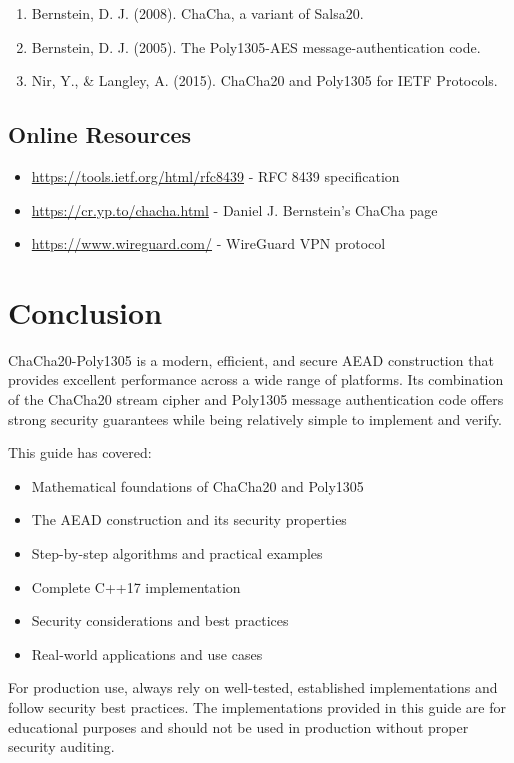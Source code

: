 \documentclass[11pt,a4paper]{article}
\begin{document}
\begin{enumerate}
    \item Bernstein, D. J. (2008). ChaCha, a variant of Salsa20.
    \item Bernstein, D. J. (2005). The Poly1305-AES message-authentication code.
    \item Nir, Y., \& Langley, A. (2015). ChaCha20 and Poly1305 for IETF Protocols.
\end{enumerate}

\subsection{Online Resources}

\begin{itemize}
    \item \url{https://tools.ietf.org/html/rfc8439} - RFC 8439 specification
    \item \url{https://cr.yp.to/chacha.html} - Daniel J. Bernstein's ChaCha page
    \item \url{https://www.wireguard.com/} - WireGuard VPN protocol
\end{itemize}

\section{Conclusion}

ChaCha20-Poly1305 is a modern, efficient, and secure AEAD construction that provides excellent performance across a wide range of platforms. Its combination of the ChaCha20 stream cipher and Poly1305 message authentication code offers strong security guarantees while being relatively simple to implement and verify.

This guide has covered:
\begin{itemize}
    \item Mathematical foundations of ChaCha20 and Poly1305
    \item The AEAD construction and its security properties
    \item Step-by-step algorithms and practical examples
    \item Complete C++17 implementation
    \item Security considerations and best practices
    \item Real-world applications and use cases
\end{itemize}

For production use, always rely on well-tested, established implementations and follow security best practices. The implementations provided in this guide are for educational purposes and should not be used in production without proper security auditing.
\end{document}
